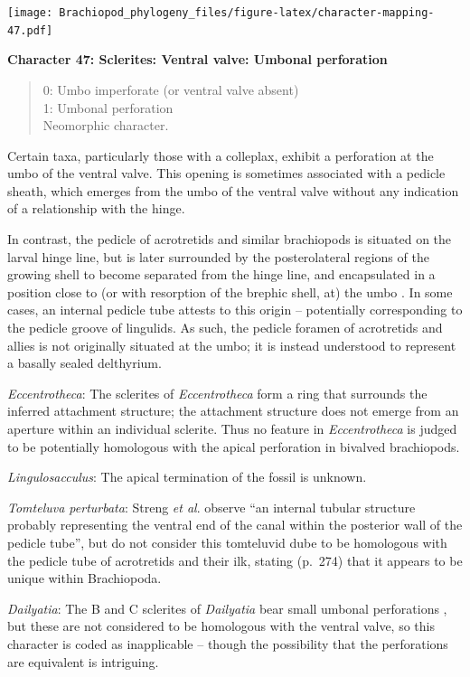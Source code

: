 \documentclass[openany]{book}
\theoremstyle{definition}
\theoremstyle{definition}
\theoremstyle{definition}
\theoremstyle{remark}
\begin{document}
\texttt{[image: Brachiopod\_phylogeny\_files/figure-latex/character-mapping-47.pdf]}

\textbf{Character 47: Sclerites: Ventral valve: Umbonal perforation}

\begin{quote}
0: Umbo imperforate (or ventral valve absent)\\
1: Umbonal perforation\\
Neomorphic character.
\end{quote}

Certain taxa, particularly those with a colleplax, exhibit a perforation
at the umbo of the ventral valve. This opening is sometimes associated
with a pedicle sheath, which emerges from the umbo of the ventral valve
without any indication of a relationship with the hinge.

In contrast, the pedicle of acrotretids and similar brachiopods is
situated on the larval hinge line, but is later surrounded by the
posterolateral regions of the growing shell to become separated from the
hinge line, and encapsulated in a position close to (or with resorption
of the brephic shell, at) the umbo \citep[see][pp.~407--411 and fig. 3
for discussion]{Popov1992TheCambrian}. In some cases, an internal
pedicle tube attests to this origin -- potentially corresponding to the
pedicle groove of lingulids. As such, the pedicle foramen of acrotretids
and allies is not originally situated at the umbo; it is instead
understood to represent a basally sealed delthyrium.

\emph{Eccentrotheca}: The sclerites of \emph{Eccentrotheca} form a ring
that surrounds the inferred attachment structure; the attachment
structure does not emerge from an aperture within an individual
sclerite. Thus no feature in \emph{Eccentrotheca} is judged to be
potentially homologous with the apical perforation in bivalved
brachiopods.

\emph{Lingulosacculus}: The apical termination of the fossil is unknown.

\emph{Tomteluva perturbata}: Streng \emph{et al}.
\citeyearpar{Streng2016Anew} observe ``an internal tubular structure
probably representing the ventral end of the canal within the posterior
wall of the pedicle tube'', but do not consider this tomteluvid dube to
be homologous with the pedicle tube of acrotretids and their ilk,
stating (p.~274) that it appears to be unique within Brachiopoda.

\emph{Dailyatia}: The B and C sclerites of \emph{Dailyatia} bear small
umbonal perforations \citep{Skovsted2015Theearly}, but these are not
considered to be homologous with the ventral valve, so this character is
coded as inapplicable -- though the possibility that the perforations
are equivalent is intriguing.
\end{document}
